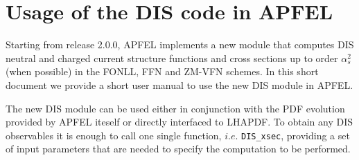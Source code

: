 \documentclass[10pt,a4paper]{article}
\begin{document}
\newpage

\section{Usage of the DIS code in APFEL}

Starting from release 2.0.0, APFEL implements a new module that
computes DIS neutral and charged current structure functions and 
cross sections up to order $\alpha_s^2$ (when possible) in the FONLL,
FFN and ZM-VFN schemes. In this short document we provide a short user
manual to use the new DIS module in APFEL.

The new DIS module can be used either in conjunction with the PDF
evolution provided by APFEL iteself or directly interfaced to LHAPDF.
To obtain any DIS observables it is enough to call one single
function, $i.e.$ {\tt DIS\_xsec}, providing a set of input parameters
that are needed to specify the computation to be performed.
\end{document}
